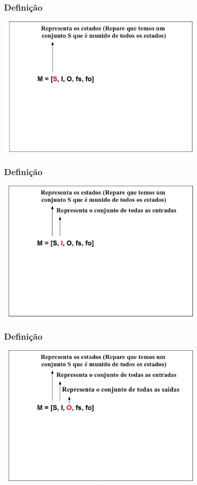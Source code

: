 \documentclass{beamer}
\begin{document}
\begin{frame}
  \frametitle{Definição}
    \includegraphics[height=2.7in, width=4in]{images/entendendo_definicao_2.png}
\end{frame}

\begin{frame}
  \frametitle{Definição}
    \includegraphics[height=2.7in, width=4in]{images/entendendo_definicao_3.png}
\end{frame}

\begin{frame}
  \frametitle{Definição}
    \includegraphics[height=2.7in, width=4in]{images/entendendo_definicao_4.png}
\end{frame}
\end{document}
